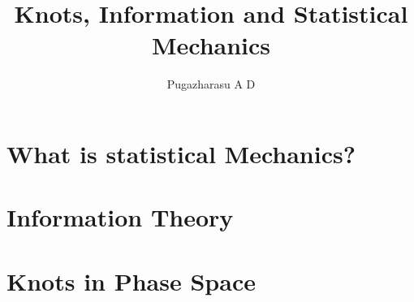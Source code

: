 \documentclass[]{article}
\title{Knots, Information and Statistical Mechanics}
\author{Pugazharasu A D}
\begin{document}
\maketitle

\begin{abstract}

\end{abstract}

\section{What is statistical Mechanics?}

\section{Information Theory}

\section{Knots in Phase Space}
\end{document}
